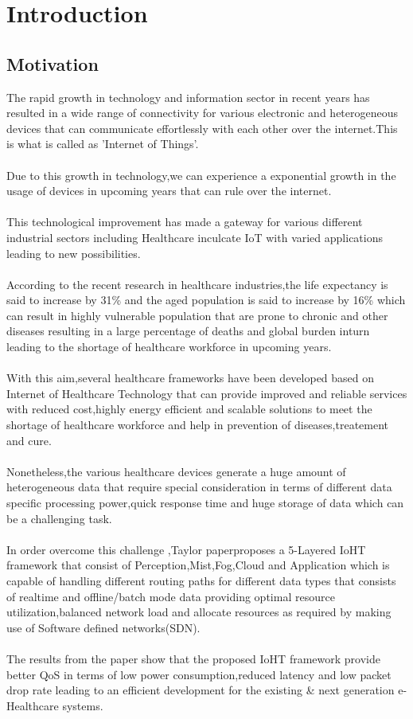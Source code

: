 \newpage
\section{Introduction}\label{sec:one}
\subsection{Motivation}
The rapid growth in technology and information sector in recent years has resulted in a wide range of connectivity for various electronic and heterogeneous devices that can communicate effortlessly with each other over the internet.This is what is called as 'Internet of Things'\cite{3}.\\ \\
Due to this growth in technology,we can experience a exponential growth in the usage of devices in upcoming years that can rule over the internet.\\ \\
This technological improvement has made a gateway for various different industrial sectors including Healthcare inculcate IoT with varied applications leading to new possibilities.\\ \\
According to the recent research in healthcare industries,the life expectancy is said to increase by 31\% and the aged population is said to increase by 16\% which can result in highly vulnerable population that are prone to chronic and other diseases resulting in a large percentage of deaths and global burden inturn leading to the shortage of healthcare workforce in upcoming years.\\ \\
With this aim,several healthcare frameworks have been developed based on Internet of Healthcare Technology that can provide improved and reliable services with reduced cost,highly energy efficient and scalable solutions to meet the shortage of healthcare workforce and help in prevention of diseases,treatement and cure.\\ \\
Nonetheless,the various healthcare devices generate a huge amount of heterogeneous data that require special consideration in terms of different data specific processing power,quick response time and huge storage of data which can be a challenging task.\\ \\
In order overcome this challenge ,Taylor paper\cite{3}proposes a 5-Layered IoHT framework that consist of Perception,Mist,Fog,Cloud and Application which is capable of handling different routing paths for different data types that consists of realtime and offline/batch mode data providing optimal resource utilization,balanced network load and allocate resources as required by making use of Software defined networks(SDN).\\ \\
The results from the paper show that the proposed IoHT framework provide better QoS in terms of low power consumption,reduced latency and low packet drop rate leading to an efficient development for the existing \& next generation e-Healthcare systems.\\ \\
